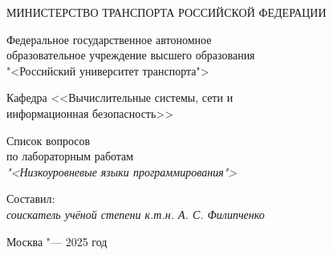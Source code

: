 \thispagestyle{empty}

\begin{center}
    МИНИСТЕРСТВО ТРАНСПОРТА РОССИЙСКОЙ ФЕДЕРАЦИИ

    \vspace{20pt}

    Федеральное государственное автономное \\ образовательное учреждение высшего образования \\
    "<Российский университет транспорта"> \\

    \vspace{20pt}

    Кафедра <<Вычислительные системы, сети и \\ информационная безопасность>>
\end{center}

\vfill

\begin{center}
    Список вопросов \\  
    по лабораторным работам \\
    \textit{"<Низкоуровневые языки программирования">}

    \vspace{20pt}

\end{center}

\vfill


    \vspace{20pt}

    \noindent Составил: \\
    \textit{соискатель учёной степени к.т.н. \hfill А. С. Филипченко}

\vfill

\begin{center}
    Москва "--- 2025 год
\end{center}
